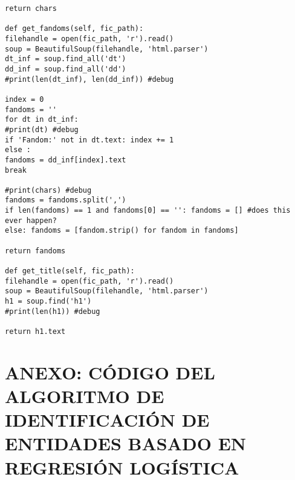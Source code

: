 \documentclass{pre-tfg}
\begin{document}
\begin{lstlisting}[style=consola]
return chars

def get_fandoms(self, fic_path):
filehandle = open(fic_path, 'r').read()
soup = BeautifulSoup(filehandle, 'html.parser')
dt_inf = soup.find_all('dt')
dd_inf = soup.find_all('dd')
#print(len(dt_inf), len(dd_inf)) #debug

index = 0
fandoms = ''
for dt in dt_inf:
#print(dt) #debug
if 'Fandom:' not in dt.text: index += 1
else :
fandoms = dd_inf[index].text
break

#print(chars) #debug
fandoms = fandoms.split(',')
if len(fandoms) == 1 and fandoms[0] == '': fandoms = [] #does this ever happen?
else: fandoms = [fandom.strip() for fandom in fandoms]

return fandoms

def get_title(self, fic_path):
filehandle = open(fic_path, 'r').read()
soup = BeautifulSoup(filehandle, 'html.parser')
h1 = soup.find('h1')
#print(len(h1)) #debug

return h1.text

\end{lstlisting}

\cleardoublepage
\section{ANEXO: CÓDIGO DEL ALGORITMO DE IDENTIFICACIÓN DE ENTIDADES BASADO EN REGRESIÓN LOGÍSTICA}
\end{document}
